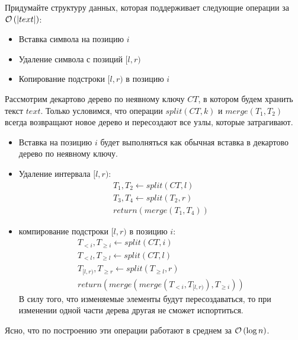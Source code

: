 \begin{task}[6]
Придумайте структуру данных, которая поддерживает следующие операции за $\mathcal{O}\left(|text|\right)$:
\begin{itemize}
	\item Вставка символа на позицию $i$
	\item Удаление символа с позиций $[l, r)$
	\item Копирование подстроки $[l, r)$ в позицию $i$
\end{itemize}
\begin{solution}
Рассмотрим декартово дерево по неявному ключу $CT$, в котором будем хранить текст $text$. Только условимся, что операции $split(CT, k)$ и $merge(T_1, T_2)$ всегда возвращают новое дерево и пересоздают все узлы, которые затрагивают.
\begin{itemize}
	\item Вставка на позицию $i$ будет выполняться как обычная вставка в декартово дерево по неявному ключу.
	\item Удаление интервала $[l, r)$:
	\[
	\begin{array}{l}
		T_1, T_2 \leftarrow split(CT, l) \\
		T_3, T_4 \leftarrow split(T_2, r) \\
		return(merge(T_1, T_4))
	\end{array} 
	\]
	\item компирование подстроки $[l, r)$ в позицию $i$:
		\[
	\begin{array}{l}
		T_{<i}, T_{\geqslant i} \leftarrow split(CT, i) \\
		T_{<l}, T_{\geqslant l} \leftarrow split(CT, l) \\
		T_{[l, r)}, T_{\geqslant r} \leftarrow split(T_{\geqslant l}, r) \\

		return(merge(merge(T_{<i}, T_{[l, r)}), T_{\geqslant i}))
	\end{array} 
	\]
	В силу того, что изменяемые элементы будут пересоздаваться, то при изменении одной части дерева другая не сможет испортиться.
\end{itemize}
Ясно, что по построению эти операции работают в среднем за $\mathcal{O}\left(\log{n}\right)$. \xqed
\end{solution}
\end{task}

